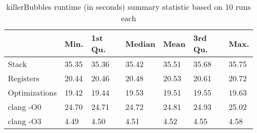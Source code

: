 \begin{table}[h!]
\centering
\begin{tabular}{p{}p{}p{}p{}p{}p{}p{}}
  \hline
 & Min. & 1st Qu. & Median & Mean & 3rd Qu. & Max. \\ 
  \hline
Stack & 35.35 & 35.36 & 35.42 & 35.51 & 35.68 & 35.75 \\ 
  Registers & 20.44 & 20.46 & 20.48 & 20.53 & 20.61 & 20.72 \\ 
  Optimizations & 19.42 & 19.44 & 19.53 & 19.51 & 19.55 & 19.63 \\ 
  clang -O0 & 24.70 & 24.71 & 24.72 & 24.81 & 24.93 & 25.02 \\ 
  clang -O3 & 4.49 & 4.50 & 4.51 & 4.52 & 4.55 & 4.58 \\ 
   \hline
\end{tabular}
\caption{killerBubbles runtime (in seconds) summary statistic based on 10 runs each}
\end{table}
